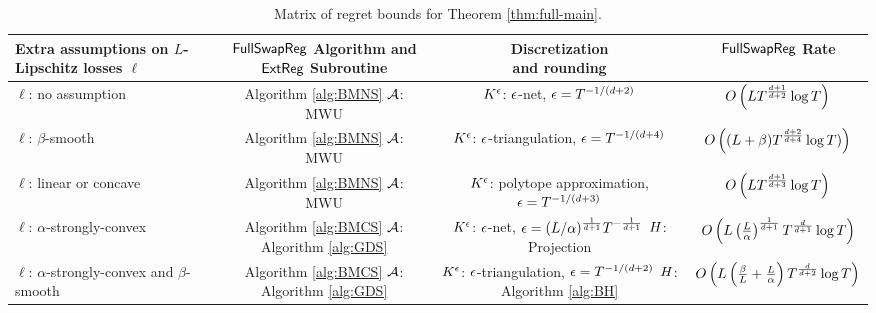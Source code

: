 \documentclass[final,12pt]{alt2025}
\begin{document}
\begin{table}\label{table:main-results}
\begin{center}\caption{Matrix of regret bounds for Theorem \ref{thm:full-main}.}
    \begin{tabular}{|l|c|c|c|}
        \hline
        \makecell{Extra assumptions \\ on $L$-Lipschitz \\ losses $\ell$}
        & \makecell{$\mathsf{FullSwapReg}$\\ Algorithm \\ and $\mathsf{ExtReg}$\\ Subroutine}
        & \makecell{Discretization\\ and rounding}
        & $\mathsf{FullSwapReg}$ Rate\\
        \hline
        $\ell$: no assumption
        &\makecell{Algorithm \ref{alg:BMNS} \\ $\mathcal{A}$: MWU}
        &\makecell{$K^{\epsilon}$: $\epsilon$-net,\\ $\epsilon = T^{-1/(d+2)}$}
        &$O\left(LT^{\frac{d+1}{d+2}}\log T\right)$\\
        \hline
        $\ell$: $\beta$-smooth
        &\makecell{Algorithm \ref{alg:BMNS} \\ $\mathcal{A}$: MWU}
        & \makecell{$K^{\epsilon}$: $\epsilon$-triangulation,\\ $\epsilon = T^{-1/(d+4)}$}
        & $O\left((L+\beta)T^{\frac{d+2}{d+4}} \log T)\right)$\\
        \hline
        $\ell$: linear or concave
        &\makecell{Algorithm \ref{alg:BMNS} \\ $\mathcal{A}$: MWU}
        &\makecell{$K^{\epsilon}$: polytope\\ approximation, \\ $\epsilon = T^{-1/(d+3)}$}
        & $O\left(LT^{\frac{d+1}{d+3}}\log T\right)$\\
        \hline
        $\ell$: $\alpha$-strongly-convex
        &\makecell{Algorithm \ref{alg:BMCS} \\ $\mathcal{A}$: Algorithm \ref{alg:GDS}}
        &\makecell{$K^{\epsilon}$: $\epsilon$-net, \\ $\epsilon = (L/\alpha)^{\frac{1}{d+1}}T^{-\frac{1}{d+1}}$ \\ $H$: Projection}
        &$O\left(L\left(\frac{L}{\alpha}\right)^{\frac{1}{d+1}}T^{\frac{d}{d+1}}\log T\right)$\\
        \hline
        \makecell{$\ell$: $\alpha$-strongly-convex\\ and $\beta$-smooth}
        &\makecell{Algorithm \ref{alg:BMCS}\\ $\mathcal{A}$: Algorithm \ref{alg:GDS}}
        &\makecell{$K^{\epsilon}$: $\epsilon$-triangulation, \\ $\epsilon = T^{-1/(d+2)}$ \\ $H$: Algorithm \ref{alg:BH}}
        &$O\left(L\left(\frac{\beta}{L}+\frac{L}{\alpha}\right)T^{\frac{d}{d+2}}\log T\right)$\\
        \hline
    \end{tabular}
\end{center}
\end{table}
\end{document}
